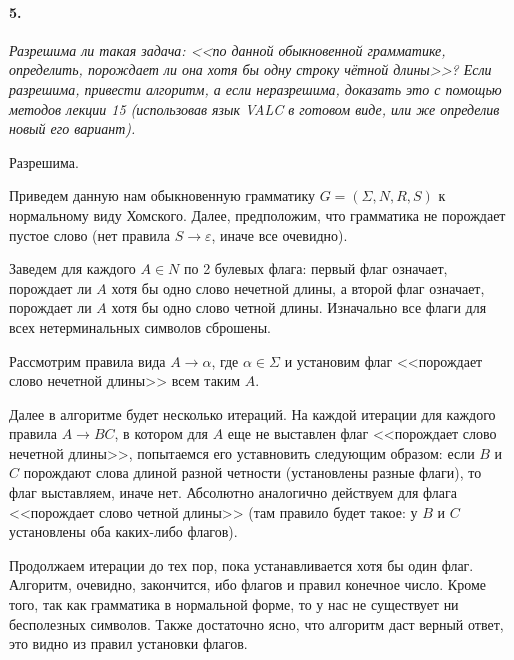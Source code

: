 \documentclass[russian,table]{article}
\begin{document}
\paragraph*{5.} \textit{Разрешима ли такая задача: <<по данной обыкновенной грамматике, определить, порождает ли она хотя бы одну строку чётной длины>>? Если разрешима, привести алгоритм, а если неразрешима, доказать это с помощью методов лекции 15 (использовав язык VALC в готовом виде, или же определив новый его вариант).}

Разрешима.

Приведем данную нам обыкновенную грамматику $G = (\Sigma,N,R,S)$ к нормальному виду Хомского. Далее, предположим, что грамматика не порождает пустое слово (нет правила $S \to \varepsilon$, иначе все очевидно).

Заведем для каждого $A \in N$ по 2 булевых флага: первый флаг означает, порождает ли $A$ хотя бы одно слово нечетной длины, а второй флаг означает, порождает ли $A$ хотя бы одно слово четной длины. Изначально все флаги для всех нетерминальных символов сброшены.

Рассмотрим правила вида $A \to \alpha$, где $\alpha \in \Sigma$ и установим флаг <<порождает слово нечетной длины>> всем таким $A$.

Далее в алгоритме будет несколько итераций. На каждой итерации для каждого правила $A \to BC$, в котором для $A$ еще не выставлен флаг <<порождает слово нечетной длины>>, попытаемся его уставновить следующим образом: если $B$ и $C$ порождают слова длиной разной четности (установлены разные флаги), то флаг выставляем, иначе нет. Абсолютно аналогично действуем для флага <<порождает слово четной длины>> (там правило будет такое: у $B$ и $C$ установлены оба каких-либо флагов).

Продолжаем итерации до тех пор, пока устанавливается хотя бы один флаг. Алгоритм, очевидно, закончится, ибо флагов и правил конечное число. Кроме того, так как грамматика в нормальной форме, то у нас не существует ни бесполезных символов.
Также достаточно ясно, что алгоритм даст верный ответ, это видно из правил установки флагов.
\end{document}
